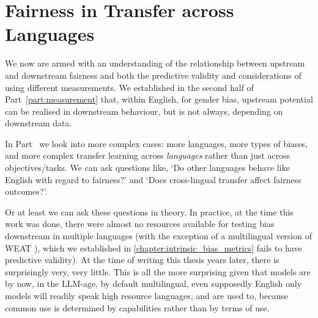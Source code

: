 \part{Fairness in Transfer across Languages}
\label{part:crosslingual}

We now are armed with an understanding of the relationship between upstream and downstream fairness and both the predictive validity and considerations of using different measurements. We established in the second half of Part~\ref{part:measurement} that, within English, for gender bias, upstream potential can be realised in downstream behaviour, but is not always, depending on downstream data.

In Part~\ref{part:crosslingual} we look into more complex cases: more languages, more types of biases, and more complex transfer learning across \textit{languages} rather than just across objectives/tasks. We can ask questions like, `Do other languages behave like English with regard to fairness?' and `Does cross-lingual transfer affect fairness outcomes?'. 

Or at least we can ask these questions in theory. In practice, at the time this work was done, there were almost no resources available for testing bias downstream in multiple languages (with the exception of a multilingual version of WEAT \citep{}), which we established in \ref{chapter:intrinsic_bias_metrics} fails to have predictive validity). At the time of writing this thesis years later, there is surprisingly very, very little. This is all the more surprising given that models are by now, in the LLM-age, by default multilingual, even supposedly English only models will readily speak high resource languages, and are used to, because common use is determined by capabilities rather than by terms of use.

